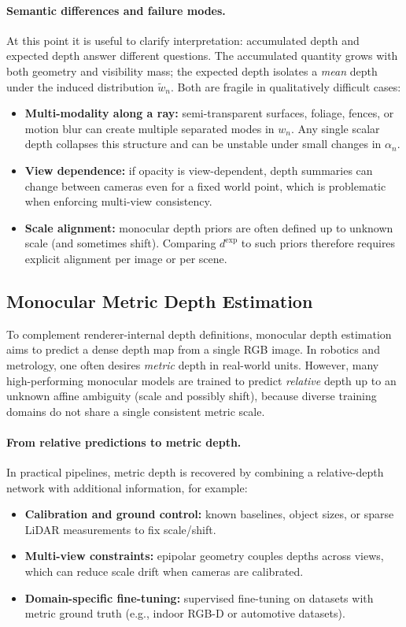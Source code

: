 \paragraph{Semantic differences and failure modes.}
At this point it is useful to clarify interpretation: accumulated depth and expected depth answer different questions. The accumulated quantity grows with both geometry and visibility mass; the expected depth isolates a \emph{mean} depth under the induced distribution $\tilde{w}_n$. Both are fragile in qualitatively difficult cases:
\begin{itemize}
    \item \textbf{Multi-modality along a ray:} semi-transparent surfaces, foliage, fences, or motion blur can create multiple separated modes in $w_n$. Any single scalar depth collapses this structure and can be unstable under small changes in $\alpha_n$.
    \item \textbf{View dependence:} if opacity is view-dependent, depth summaries can change between cameras even for a fixed world point, which is problematic when enforcing multi-view consistency.
    \item \textbf{Scale alignment:} monocular depth priors are often defined up to unknown scale (and sometimes shift). Comparing $d^{\mathrm{exp}}$ to such priors therefore requires explicit alignment per image or per scene.
\end{itemize}

\subsection{Monocular Metric Depth Estimation}
To complement renderer-internal depth definitions, monocular depth estimation aims to predict a dense depth map from a single RGB image. In robotics and metrology, one often desires \emph{metric} depth in real-world units. However, many high-performing monocular models are trained to predict \emph{relative} depth up to an unknown affine ambiguity (scale and possibly shift), because diverse training domains do not share a single consistent metric scale.

\paragraph{From relative predictions to metric depth.}
In practical pipelines, metric depth is recovered by combining a relative-depth network with additional information, for example:
\begin{itemize}
    \item \textbf{Calibration and ground control:} known baselines, object sizes, or sparse LiDAR measurements to fix scale/shift.
    \item \textbf{Multi-view constraints:} epipolar geometry couples depths across views, which can reduce scale drift when cameras are calibrated.
    \item \textbf{Domain-specific fine-tuning:} supervised fine-tuning on datasets with metric ground truth (e.g., indoor RGB-D or automotive datasets).
\end{itemize}

